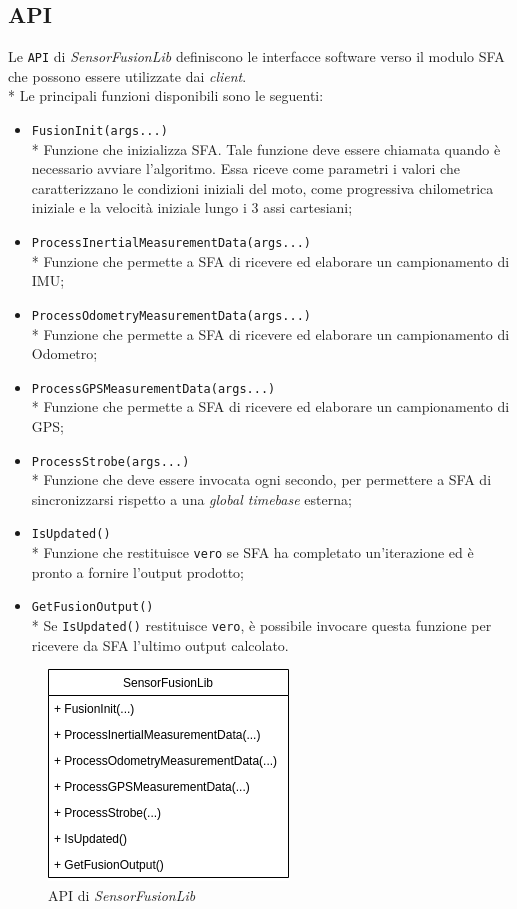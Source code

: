 \subsection{API}
Le \texttt{API} di \emph{SensorFusionLib} definiscono le interfacce software verso il modulo SFA che possono essere utilizzate dai \emph{client}.\\*
Le principali funzioni disponibili sono le seguenti:
\begin{itemize}
	\item \texttt{FusionInit(args...)}\\*
	Funzione che inizializza SFA. Tale funzione deve essere chiamata quando \`e necessario avviare l'algoritmo. Essa riceve come parametri i valori che caratterizzano le condizioni iniziali del moto, come progressiva chilometrica iniziale e la velocit\`a iniziale lungo i 3 assi cartesiani;
	\item \texttt{ProcessInertialMeasurementData(args...)}\\*
	Funzione che permette a SFA di ricevere ed elaborare un campionamento di IMU; 
	\item \texttt{ProcessOdometryMeasurementData(args...)}\\*
	Funzione che permette a SFA di ricevere ed elaborare un campionamento di Odometro;
	\item \texttt{ProcessGPSMeasurementData(args...)}\\*
	Funzione che permette a SFA di ricevere ed elaborare un campionamento di GPS;
	\item \texttt{ProcessStrobe(args...)}\\*
	Funzione che deve essere invocata ogni secondo, per permettere a SFA di sincronizzarsi rispetto a una \emph{global timebase} esterna; \cite{clock}
	\item 
	\texttt{IsUpdated()}\\*
	Funzione che restituisce \texttt{vero} se SFA ha completato un'iterazione ed \`e pronto a fornire l'output prodotto;
	\item \texttt{GetFusionOutput()}\\*
	Se \texttt{IsUpdated()} restituisce \texttt{vero}, \`e possibile invocare questa funzione per ricevere da SFA l'ultimo output calcolato.
\end{itemize}
\begin{figure}[h]
	\centering
	\includegraphics[width=0.7\linewidth]{img/SensorFusionLib}
	\caption{API di \textit{SensorFusionLib}}
	\label{fig:sfaapi}
\end{figure}
